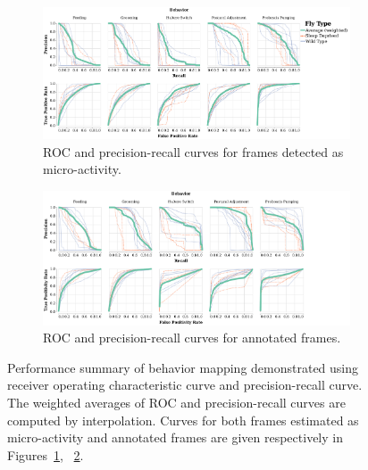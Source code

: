 \begin{figure}[htb!]
	\centering
	\begin{subfigure}[b]{0.995\linewidth}
		\centering\includegraphics[width=\linewidth]{figures/PRC_ROC-DActfiltered.pdf}
		\caption{ROC and precision-recall curves for frames detected as micro-activity. \label{figure:ROC-PRC-Act}}
	\end{subfigure}%

	\begin{subfigure}[htb!]{0.995\linewidth}
		\centering\includegraphics[width=\linewidth]{figures/PRC_ROC-DAnnfiltered.pdf}
		\caption{ROC and precision-recall curves for annotated frames. \label{figure:ROC-PRC-Ann}}
	\end{subfigure}%
	\caption[Performance summary of behavior mapping demonstrated using receiver operating characteristic curve and precision-recall curve.
	]{Performance summary of behavior mapping demonstrated using receiver operating characteristic curve and precision-recall curve.
		The weighted averages of ROC and precision-recall curves are computed by interpolation.
		Curves for both frames estimated as micro-activity and annotated frames are given respectively in Figures~\ref{figure:ROC-PRC-Act}, ~\ref{figure:ROC-PRC-Ann}. \label{figure:ROC-PRC}}
\end{figure}

